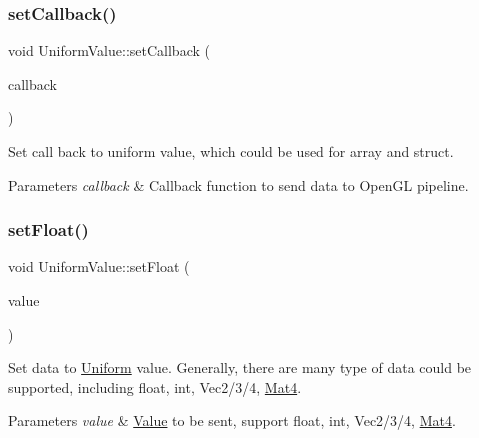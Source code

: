 \subsubsection{\texorpdfstring{set\+Callback()}{setCallback()}\hspace{0.1cm}{\footnotesize\ttfamily [2/2]}}
{\footnotesize\ttfamily void Uniform\+Value\+::set\+Callback (\begin{DoxyParamCaption}\item[{const std\+::function$<$ void(\hyperlink{classGLProgram}{G\+L\+Program} $\ast$, \hyperlink{structUniform}{Uniform} $\ast$)$>$ \&}]{callback }\end{DoxyParamCaption})}

Set call back to uniform value, which could be used for array and struct. 
\begin{DoxyParams}{Parameters}
{\em callback} & Callback function to send data to Open\+GL pipeline. \\
\hline
\end{DoxyParams}
\mbox{\label{classUniformValue_a8d11e6e7ce795e5e29e9f1c2c6cbf8ff}} 
\subsubsection{\texorpdfstring{set\+Float()}{setFloat()}\hspace{0.1cm}{\footnotesize\ttfamily [1/2]}}
{\footnotesize\ttfamily void Uniform\+Value\+::set\+Float (\begin{DoxyParamCaption}\item[{float}]{value }\end{DoxyParamCaption})}

Set data to \hyperlink{structUniform}{Uniform} value. Generally, there are many type of data could be supported, including float, int, Vec2/3/4, \hyperlink{classMat4}{Mat4}. 
\begin{DoxyParams}{Parameters}
{\em value} & \hyperlink{classValue}{Value} to be sent, support float, int, Vec2/3/4, \hyperlink{classMat4}{Mat4}. \\
\hline
\end{DoxyParams}
\mbox{\label{classUniformValue_a8d11e6e7ce795e5e29e9f1c2c6cbf8ff}} 
